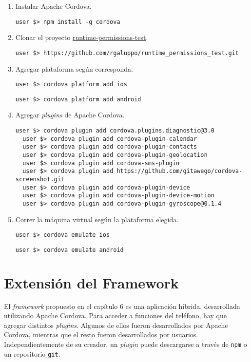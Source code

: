 \begin{enumerate}
    \item Instalar Apache Cordova.
        \begin{lstlisting}[style=DOS]
  user $> npm install -g cordova
        \end{lstlisting}
    \item Clonar el proyecto \href{https://github.com/rgaluppo/runtime_permissions_test}{runtime-permissions-test}.
    \begin{lstlisting}[style=DOS]
  user $> https://github.com/rgaluppo/runtime_permissions_test.git
  \end{lstlisting}
    \item Agregar plataforma según corresponda.
        \begin{lstlisting}[style=DOS]
  user $> cordova platform add ios
        \end{lstlisting}
        \begin{lstlisting}[style=DOS]
  user $> cordova platform add android
        \end{lstlisting}
    \item Agregar \emph{plugins} de Apache Cordova.
        \begin{lstlisting}[style=DOS]
  user $> cordova plugin add cordova.plugins.diagnostic@3.0
  user $> cordova plugin add cordova-plugin-calendar
  user $> cordova plugin add cordova-plugin-contacts
  user $> cordova plugin add cordova-plugin-geolocation
  user $> cordova plugin add cordova-sms-plugin
  user $> cordova plugin add https://github.com/gitawego/cordova-screenshot.git
  user $> cordova plugin add cordova-plugin-device
  user $> cordova plugin add cordova-plugin-device-motion
  user $> cordova plugin add cordova-plugin-gyroscope@0.1.4
        \end{lstlisting}
    \item Correr la máquina virtual según la plataforma elegida.
        \begin{lstlisting}[style=DOS]
  user $> cordova emulate ios
        \end{lstlisting}
        \begin{lstlisting}[style=DOS]
  user $> cordova emulate android
        \end{lstlisting}
\end{enumerate}
\section*{Extensión del Framework}
El \emph{framework} propuesto en el capítulo 6 es una aplicación híbrida, desarrollada utilizando Apache Cordova. Para acceder a funciones del teléfono, hay que agregar distintos \emph{plugins}. Algunos de ellos fueron desarrollados por Apache Cordova, mientras que el resto fueron desarrollados por usuarios. Independientemente de su creador, un \emph{plugin} puede descargarse a través de \texttt{npm} o un repositorio \texttt{git}.\\

